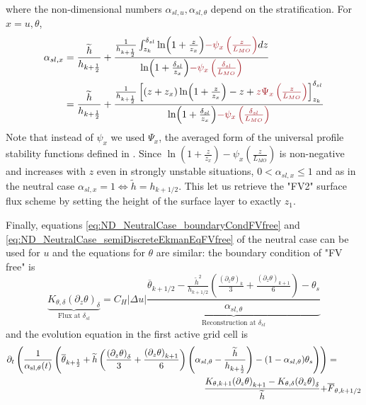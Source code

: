 where the non-dimensional numbers $\alpha_{sl, u},
\alpha_{sl, \theta}$ depend on the stratification. For $x=u, \theta$,
\begin{equation}
	\begin{aligned}
	\alpha_{sl, x} &= \frac{\widetilde{h}}{h_{k+\frac{1}{2}}} +
	\frac{\frac{1}{h_{k+\frac{1}{2}}}\int_{z_k}^{\delta_{sl}}
	\ln(1+\frac{z}{z_{x}})
		\emphase{- \psi_x\left(\frac{z}{L_{MO}}\right)}
	dz}{\ln(1+\frac{\delta_{sl}}{z_{x}})
		\emphase{- \psi_x\left(\frac{\delta_{sl}}{L_{MO}}\right)
		}} \\
		&=\frac{\widetilde{h}}{h_{k+\frac{1}{2}}} +
 \frac{\frac{1}{{h_{k+\frac{1}{2}}}}
    \left[
	    (z+z_{x})\ln(1+\frac{z}{z_{x}})-z
		+\emphase{ z \Psi_x\left(\frac{z}{L_{MO}}\right)}
	\right]_{z_k}^{\delta_{sl}}
    }{\ln(1+\frac{\delta_{sl}}{z_{x}})
		\emphase{- \psi_x\left(\frac{\delta_{sl}}{L_{MO}}\right)
		}}
\end{aligned}
\end{equation}
Note that instead of $\psi_x$ we used $\Psi_x$,
the averaged form of the universal
profile stability functions defined in \citep{nishizawa_surface_2018}.
%
Since $\ln(1+\frac{z}{z_{x}})-
\psi_x(\frac{z}{L_{MO}})$ is non-negative and increases with $z$ even
in strongly unstable situations,
$0 < \alpha_{sl, x} \leq 1$ and as in the neutral case
$\alpha_{sl, x}=1 \iff \widetilde{h}=h_{k+1/2}$. This let us retrieve
the "FV2" surface flux scheme by setting the height of the surface
layer to exactly $z_1$.
\par
Finally, equations \eqref{eq:ND_NeutralCase_boundaryCondFVfree} and
\eqref{eq:ND_NeutralCase_semiDiscreteEkmanEqFVfree} of the
neutral case can be used for
$u$ and the equations for $\theta$ are similar:
the boundary condition of "FV free" is
\begin{equation}
	\label{eq:ND_StratifiedCase_semiDiscreteEkmanEqFVfree}
	\underbrace{K_{\theta, \delta} (\partial_z \theta)_\delta}_{
		\text{Flux at } \delta_{sl}
	} = 
	C_H|\Delta u|\underbrace{
	\frac{
  \overline{\theta}_{k+1/2} - \frac{\widetilde{h}^2}{h_{k+1/2}}
	(\frac{{(\partial_z \theta)}_k}{3} +
	\frac{{(\partial_z \theta)}_{k+1}}{6}) 
  - \theta_s
}{\alpha_{sl, \theta}}
	}_{\text{Reconstruction at } \delta_{sl}}
\end{equation}
and the evolution equation in the first active grid cell is
\begin{equation}
    \begin{aligned}
	\label{eq:ND_StratifiedCase_semiDiscreteEkmanEqPTFVfree}
	    \partial_t \left(\frac{1}{\alpha_{\rm sl, \theta}(t)}
	    \left(
	    \overline{\theta}_{k+\frac{1}{2}} +
	\widetilde{h}\left(\frac{{(\partial_z \theta)}_\delta}{3} +
	\frac{{(\partial_z \theta)}_{k+1}}{6}\right)
		\left(\alpha_{sl, \theta} -
	    	\frac{\widetilde{h}}{h_{k+\frac{1}{2}}}\right)
	 - (1 - \alpha_{sl, \theta})\theta_s
	    \right) \right)&
	= \\
	    \frac{K_{\theta, k+1}{(\partial_z \theta)}_{k+1} -
	K_{\theta,\delta} {(\partial_z \theta)}_\delta}{\widetilde{h}}
	    + &\overline{F}_{\theta, k+1/2}
    \end{aligned}
\end{equation}
